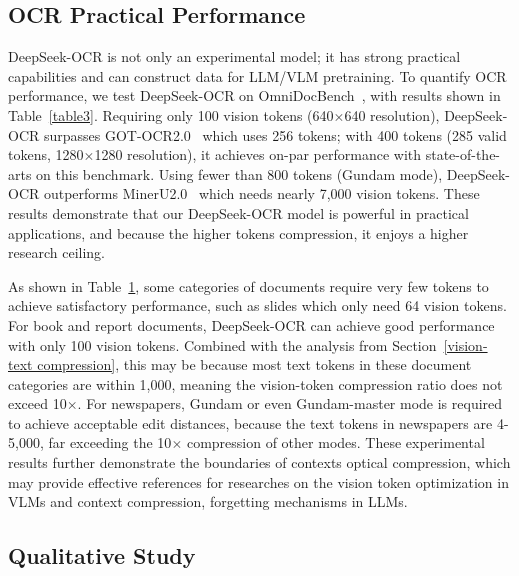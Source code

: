 \documentclass[11pt, a4paper, logo, copyright, nonumbering]{deepseek}
\begin{document}
\begin{CJK*}{UTF8}{gbsn}
\begin{table}[!h]
{\begin{tabular}{c|*{10}{c}}

			\bottomrule		
	\end{tabular}}		

	\label{table4}
\end{table}


\subsection{OCR Practical Performance}

DeepSeek-OCR is not only an experimental model; it has strong practical capabilities and can construct data for LLM/VLM pretraining. To quantify OCR performance, we test DeepSeek-OCR on OmniDocBench~\cite{ouyang2025omnidocbench}, with results shown in Table~\ref{table3}. Requiring only 100 vision tokens (640$\times$640 resolution), DeepSeek-OCR surpasses GOT-OCR2.0~\cite{wei2024general} which uses 256 tokens; with 400 tokens (285 valid tokens, 1280$\times$1280 resolution), it achieves on-par performance with state-of-the-arts on this benchmark. Using fewer than 800 tokens (Gundam mode), DeepSeek-OCR outperforms MinerU2.0~\cite{wang2024mineru} which needs nearly 7,000 vision tokens. These results demonstrate that our DeepSeek-OCR model is powerful in practical applications, and because the higher tokens compression, it enjoys a higher research ceiling. 

As shown in Table~\ref{table4}, some categories of documents require very few tokens to achieve satisfactory performance, such as slides which only need 64 vision tokens. For book and report documents, DeepSeek-OCR can achieve good performance with only 100 vision tokens. Combined with the analysis from Section~\ref{vision-text compression}, this may be because most text tokens in these document categories are within 1,000, meaning the vision-token compression ratio does not exceed 10$\times$. For newspapers, Gundam or even Gundam-master mode is required to achieve acceptable edit distances, because the text tokens in newspapers are 4-5,000, far exceeding the 10$\times$ compression of other modes. These experimental results further demonstrate the boundaries of contexts optical compression, which may provide effective references for researches on the vision token optimization in VLMs and context compression, forgetting mechanisms in LLMs.

\subsection{Qualitative Study}


\end{CJK*}
\end{document}
